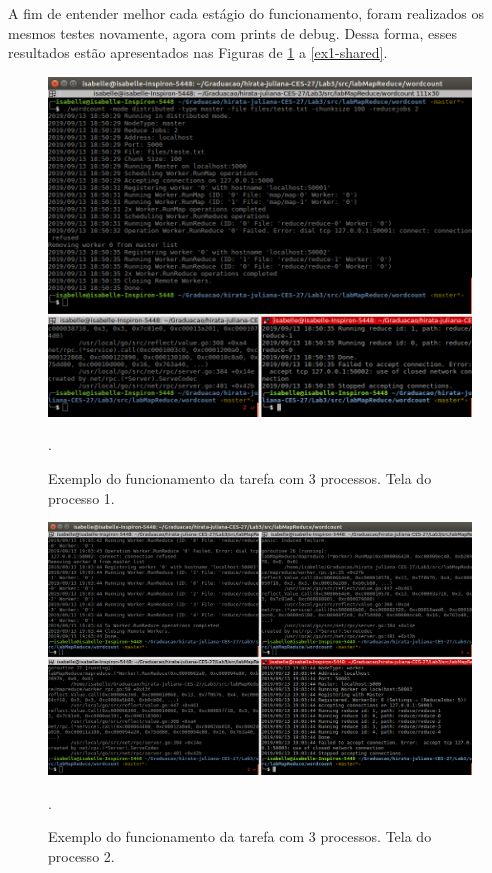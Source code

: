 \documentclass[conference]{IEEEtran}
\begin{document}
	A fim de entender melhor cada estágio do funcionamento, foram realizados os mesmos testes novamente, agora com prints de debug. Dessa forma, esses resultados estão apresentados nas Figuras de \ref{ex1-proc1} a \ref{ex1-shared}.
	
\begin{figure}[H]
\centering
\centerline{\includegraphics[scale=0.5]{imagens/tarefa_2_3_reduce/tarefa_2_3_reduce.png}}
\caption{Exemplo do funcionamento da tarefa com 3 processos. Tela do processo 1.}.
\label{ex1-proc1}
\end{figure}

\begin{figure}[H]
\centering
\centerline{\includegraphics[scale=0.5]{imagens/tarefa_2_4_1/tarefa_2_4_1.png}}
\caption{Exemplo do funcionamento da tarefa com 3 processos. Tela do processo 2.}.
\label{ex1-proc2}
\end{figure}
\end{document}
